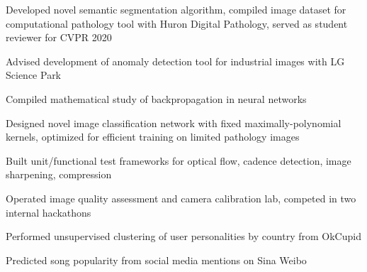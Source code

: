 \documentclass[letterpaper, 12pt]{cv_style}
\begin{document}
\begin{ditem}
	\item Developed novel semantic segmentation algorithm, compiled image dataset for computational pathology tool with Huron Digital Pathology, served as student reviewer for CVPR 2020\\
	\item Advised development of anomaly detection tool for industrial images with LG Science Park\\
	\item Compiled mathematical study of backpropagation in neural networks\\
\end{ditem}

%
\begin{ditem}
	\item Designed novel image classification network with fixed maximally-polynomial kernels, optimized for efficient training on limited pathology images
\end{ditem}
%
\begin{ditem}
	\item Built unit/functional test frameworks for optical flow, cadence detection, image sharpening, compression
	\item Operated image quality assessment and camera calibration lab, competed in two internal hackathons
\end{ditem}
%
\begin{ditem}
	\item Performed unsupervised clustering of user personalities by country from OkCupid
	\item Predicted song popularity from social media mentions on Sina Weibo
\end{ditem}
%
\end{document}
